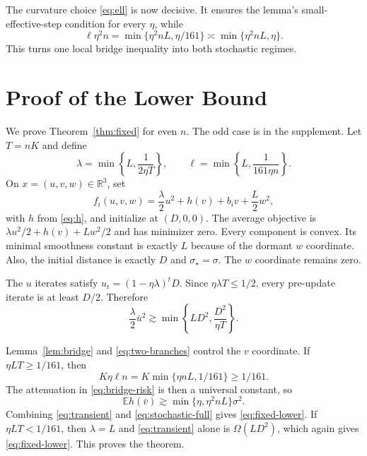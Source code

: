 \documentclass[twoside]{article}
\newcommand{\E}{\mathbb E}
\newcommand{\R}{\mathbb R}
\newcommand{\asympdown}{\mathrel{\gtrsim}}
\begin{document}
The curvature choice \eqref{eq:ell} is now decisive. It ensures the lemma's small-effective-step condition for every $\eta$, while
\begin{equation}
 \ell\eta^2n
 =\min\{\eta^2nL,\eta/161\}
 \asymp\min\{\eta^2nL,\eta\}.
 \label{eq:two-branches}
\end{equation}
This turns one local bridge inequality into both stochastic regimes.

\section{Proof of the Lower Bound}
\label{sec:proof}

We prove Theorem~\ref{thm:fixed} for even $n$. The odd case is in the supplement. Let $T=nK$ and define
\begin{equation}
 \lambda=\min\left\{L,\frac{1}{2\eta T}\right\},
 \qquad \ell=\min\left\{L,\frac{1}{161\eta n}\right\}.
 \label{eq:curvatures}
\end{equation}
On $x=(u,v,w)\in\R^3$, set
\begin{equation}
 f_i(u,v,w)=\frac\lambda2u^2+h(v)+b_iv+\frac L2w^2,
 \label{eq:hard}
\end{equation}
with $h$ from \eqref{eq:h}, and initialize at $(D,0,0)$. The average objective is $\lambda u^2/2+h(v)+Lw^2/2$ and has minimizer zero. Every component is convex. Its minimal smoothness constant is exactly $L$ because of the dormant $w$ coordinate. Also, the initial distance is exactly $D$ and $\sigma_\star=\sigma$. The $w$ coordinate remains zero.

The $u$ iterates satisfy $u_t=(1-\eta\lambda)^tD$. Since $\eta\lambda T\le1/2$, every pre-update iterate is at least $D/2$. Therefore
\begin{equation}
 \frac\lambda2\bar u^2
 \asympdown \min\left\{LD^2,\frac{D^2}{\eta T}\right\}.
 \label{eq:transient}
\end{equation}

Lemma~\ref{lem:bridge} and \eqref{eq:two-branches} control the $v$ coordinate. If $\eta L T\ge1/161$, then \[ K\eta\ell n=K\min\{\eta nL,1/161\}\ge1/161. \] The attenuation in \eqref{eq:bridge-risk} is then a universal constant, so
\begin{equation}
 \E h(\bar v)
 \asympdown\min\{\eta,\eta^2nL\}\sigma^2.
 \label{eq:stochastic-full}
\end{equation}
Combining \eqref{eq:transient} and \eqref{eq:stochastic-full} gives \eqref{eq:fixed-lower}. If $\eta LT<1/161$, then $\lambda=L$ and \eqref{eq:transient} alone is $\Omega(LD^2)$, which again gives \eqref{eq:fixed-lower}. This proves the theorem.
\end{document}
